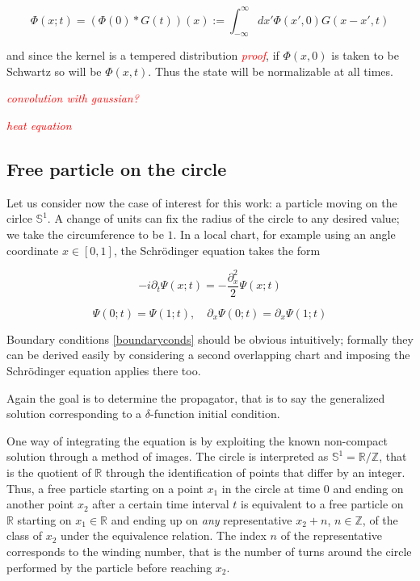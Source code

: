 \documentclass{article}
\newcommand{\ess}{\ensuremath{\mathbb{S}}}
\newcommand{\ar}{\ensuremath{\mathbb{R}}}
\newcommand{\cmnt}[1]{\textcolor{red}{\emph{#1}}}
\newcommand{\intR}{\int_{-\infty}^\infty}
\begin{document}
\begin{equation}
    \Phi(x;t) = \left(\Phi(0) * G(t) \right)(x) := \intR dx' \Phi(x',0) G(x-x',t)
\end{equation}

and since the kernel is a tempered distribution \cmnt{proof}, if $\Phi(x,0)$ is taken to be Schwartz so will be $\Phi(x,t)$. Thus the state will be normalizable at all times.

\cmnt{convolution with gaussian?}

\cmnt{heat equation}

\subsection{Free particle on the circle}

Let us consider now the case of interest for this work: a particle moving on the cirlce $\ess^1$. A change of units can fix the radius of the circle to any desired value; we take the circumference to be $1$. In a local chart, for example using an angle coordinate $x \in [0,1]$, the Schr\"odinger equation takes the form

\begin{equation}
    -i\partial_t \Psi(x;t) = - \frac{\partial_x^2}{2} \Psi(x;t)
\end{equation}

\begin{equation}    
    \label{boundaryconds}
    \Psi(0;t) = \Psi(1;t), \quad \partial_x \Psi(0;t) = \partial_x \Psi(1;t)
\end{equation}

Boundary conditions \eqref{boundaryconds} should be obvious intuitively; formally they can be derived easily by considering a second overlapping chart and imposing the Schr\"odinger equation applies there too.

Again the goal is to determine the propagator, that is to say the generalized solution corresponding to a $\delta$-function initial condition.

One way of integrating the equation is by exploiting the known non-compact solution through a method of images. The circle is interpreted as $\ess^1 = \ar / \mathbb{Z}$, that is the quotient of $\ar$ through the identification of points that differ by an integer. Thus, a free particle starting on a point $x_1$ in the circle at time $0$ and ending on another point $x_2$ after a certain time interval $t$ is equivalent to a free particle on $\mathbb{R}$ starting on $x_1 \in \mathbb{R}$ and ending up on \emph{any} representative $x_2 + n$, $n\in\mathbb{Z}$, of the class of $x_2$ under the equivalence relation. The index $n$ of the representative corresponds to the winding number, that is the number of turns around the circle performed by the particle before reaching $x_2$.
\end{document}
